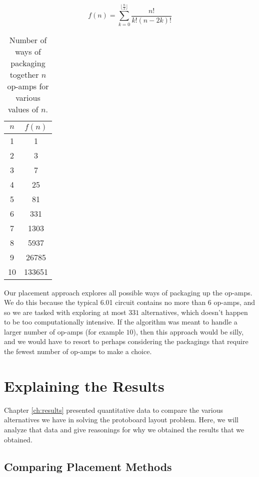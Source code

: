 \begin{equation}
f(n) = \sum\limits_{k=0}^{\lfloor\frac{n}{2}\rfloor}{\frac{n!}{k!(n - 2k)!}}
\label{eq:opamp}
\end{equation}

\begin{table}
\begin{center}
\begin{singlespace}
\begin{tabular}{c | c}
$n$ & $f(n)$ \\
\hline
\hline
1 & 1 \\
2 & 3 \\
3 & 7 \\
4 & 25 \\
5 & 81 \\
6 & 331 \\
7 & 1303 \\
8 & 5937 \\
9 & 26785 \\
10 & 133651
\end{tabular}
\end{singlespace}
\end{center}
\label{tb:opamp}
\caption{Number of ways of packaging together $n$ op-amps for various values of
$n$.}
\end{table}

Our placement approach explores all possible ways
of packaging up the op-amps. We do this because the typical 6.01 circuit contains
no more than $6$ op-amps, and so we are tasked with exploring at most $331$
alternatives, which doesn't happen to be too computationally intensive. If the
algorithm was meant to handle a larger number of op-amps (for example $10$), then
this approach would be silly, and we would have to resort to perhaps considering
the packagings that require the fewest number of op-amps to make a choice.

\section{Explaining the Results}

Chapter \ref{ch:results} presented quantitative data to compare the various
alternatives we have in solving the protoboard layout problem. Here, we will
analyze that data and give reasonings for why we obtained the results
that we obtained.

\subsection{Comparing Placement Methods}

